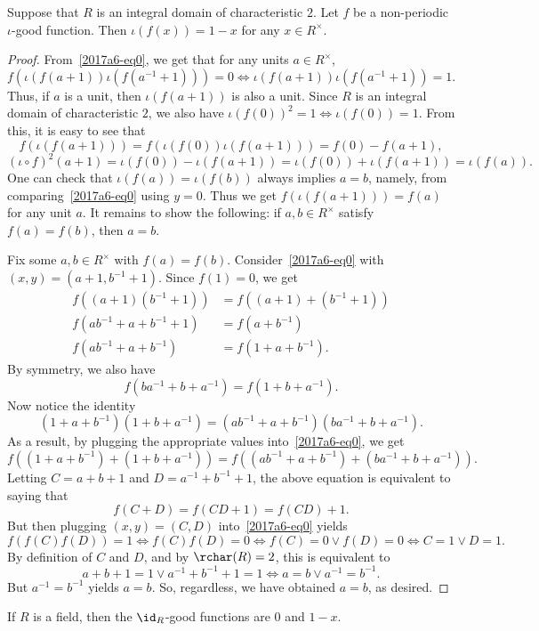 \begin{lemma}\label{2017a6-integral-domain-char2-unit}
Suppose that $R$ is an integral domain of characteristic $2$.
Let $f$ be a non-periodic $\iota$-good function.
Then $\iota(f(x)) = 1 - x$ for any $x \in R^{\times}$.
\end{lemma}
\begin{proof}
From~\eqref{2017a6-eq0}, we get that for any units $a \in R^{\times}$,
\[ f(\iota(f(a + 1)) \iota(f(a^{-1} + 1))) = 0 \iff \iota(f(a + 1)) \iota(f(a^{-1} + 1)) = 1. \]
Thus, if $a$ is a unit, then $\iota(f(a + 1))$ is also a unit.
Since $R$ is an integral domain of characteristic $2$, we also have $\iota(f(0))^2 = 1 \iff \iota(f(0)) = 1$.
From this, it is easy to see that
\[ f(\iota(f(a + 1))) = f(\iota(f(0)) \iota(f(a + 1))) = f(0) - f(a + 1), \]
\[ (\iota \circ f)^2(a + 1) = \iota(f(0)) - \iota(f(a + 1)) = \iota(f(0)) + \iota(f(a + 1)) = \iota(f(a)). \]
One can check that $\iota(f(a)) = \iota(f(b))$ always implies $a = b$, namely, from comparing~\eqref{2017a6-eq0} using $y = 0$.
Thus we get $f(\iota(f(a + 1))) = f(a)$ for any unit $a$.
It remains to show the following: if $a, b \in R^{\times}$ satisfy $f(a) = f(b)$, then $a = b$.

Fix some $a, b \in R^{\times}$ with $f(a) = f(b)$.
Consider~\eqref{2017a6-eq0} with $(x, y) = (a + 1, b^{-1} + 1)$.
Since $f(1) = 0$, we get
\begin{align*}
    f((a + 1)(b^{-1} + 1)) &= f((a + 1) + (b^{-1} + 1)) \\
    f(ab^{-1} + a + b^{-1} + 1) &= f(a + b^{-1}) \\
    f(ab^{-1} + a + b^{-1}) &= f(1 + a + b^{-1}).
\end{align*}
By symmetry, we also have
\[ f(ba^{-1} + b + a^{-1}) = f(1 + b + a^{-1}). \]
Now notice the identity
\[ (1 + a + b^{-1})(1 + b + a^{-1}) = (ab^{-1} + a + b^{-1})(ba^{-1} + b + a^{-1}). \]
As a result, by plugging the appropriate values into~\eqref{2017a6-eq0}, we get
\[ f((1 + a + b^{-1}) + (1 + b + a^{-1})) = f((ab^{-1} + a + b^{-1}) + (ba^{-1} + b + a^{-1})). \]
Letting $C = a + b + 1$ and $D = a^{-1} + b^{-1} + 1$, the above equation is equivalent to saying that
\[ f(C + D) = f(CD + 1) = f(CD) + 1. \]
But then plugging $(x, y) = (C, D)$ into~\eqref{2017a6-eq0} yields
\[ f(f(C) f(D)) = 1 \iff f(C) f(D) = 0 \iff f(C) = 0 \vee f(D) = 0 \iff C = 1 \vee D = 1. \]
By definition of $C$ and $D$, and by $\rchar(R) = 2$, this is equivalent to
\[ a + b + 1 = 1 \vee a^{-1} + b^{-1} + 1 = 1 \iff a = b \vee a^{-1} = b^{-1}. \]
But $a^{-1} = b^{-1}$ yields $a = b$.
So, regardless, we have obtained $a = b$, as desired.
\end{proof}

\begin{corollary}
If $R$ is a field, then the $\id_R$-good functions are $0$ and $1 - x$.
\end{corollary}
